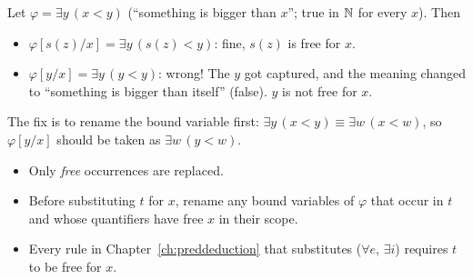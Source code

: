 \begin{example}
Let $\varphi = \exists y\,(x<y)$ (``something is bigger than $x$''; true in $\mathbb{N}$ for every
$x$). Then
\begin{itemize}
  \item $\varphi[s(z)/x]=\exists y\,(s(z)<y)$: fine, $s(z)$ is free for $x$.
  \item $\varphi[y/x]=\exists y\,(y<y)$: wrong! The $y$ got captured, and the meaning
        changed to ``something is bigger than itself'' (false). $y$ is not free for $x$.
\end{itemize}
The fix is to rename the bound variable first: $\exists y\,(x<y)\equiv\exists w\,(x<w)$, so
$\varphi[y/x]$ should be taken as $\exists w\,(y<w)$.
\end{example}
\begin{center}
\end{center}

\begin{important}
\begin{itemize}
  \item Only \emph{free} occurrences are replaced.
  \item Before substituting $t$ for $x$, rename any bound variables of $\varphi$ that occur
        in $t$ and whose quantifiers have free $x$ in their scope.
  \item Every rule in Chapter~\ref{ch:preddeduction} that substitutes ($\forall e$,
        $\exists i$) requires $t$ to be free for $x$.
\end{itemize}
\end{important}

